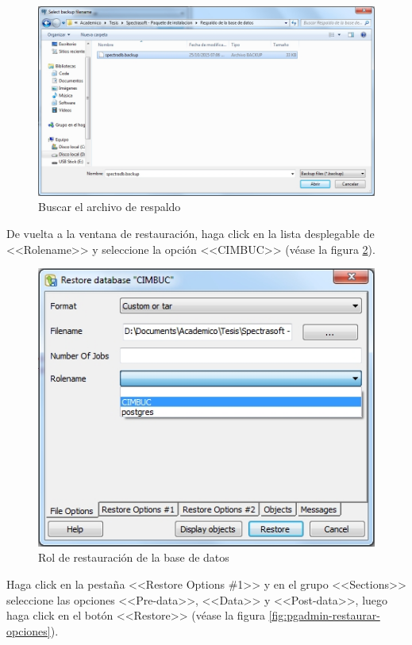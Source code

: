 \begin{figure}[H]
  \centering
  \includegraphics[width=1\linewidth]{./img/pgadmin-restaurar-buscar.jpg}
\caption[]{Buscar el archivo de respaldo\label{fig:pgadmin-restaurar-buscar}}
\end{figure}

\newpage

De vuelta a la ventana de restauraci\'{o}n, haga click en la lista desplegable de <<Rolename>> y seleccione la opci\'{o}n <<CIMBUC>> (v\'{e}ase la figura \ref{fig:pgadmin-restaurar-rol}).

\begin{figure}[H]
  \centering
  \includegraphics[width=.6\linewidth]{./img/pgadmin-restaurar-rol.jpg}
\caption[]{Rol de restauraci\'{o}n de la base de datos\label{fig:pgadmin-restaurar-rol}}
\end{figure}

Haga click en la pesta\~{n}a <<Restore Options \#1>> y en el grupo <<Sections>> seleccione las opciones <<Pre-data>>, <<Data>> y <<Post-data>>, luego haga click en el bot\'{o}n <<Restore>> (v\'{e}ase la figura \ref{fig:pgadmin-restaurar-opciones}).

